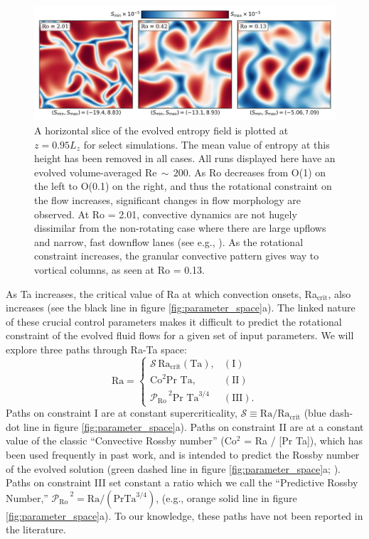 \documentclass[twocolumn, amsmath, amsfonts, amssymb]{aastex62}
\newcommand{\pro}{\ensuremath{\mathcal{P}_{\text{Ro}}\,}}
\begin{document}
\begin{figure}[t]
    \includegraphics[width=\textwidth]{dynamics_plot.png}
    \caption{ A horizontal slice of the evolved entropy field is plotted at $z = 0.95L_z$
    for select simulations. The mean value of entropy at this height has been removed in all
    cases. All runs displayed here have an evolved volume-averaged Re$\,\sim\,200$. 
    As Ro decreases from O(1) on the left to O(0.1) on the right, and thus the rotational
    constraint on the flow increases, significant changes in flow morphology are observed.
    At Ro = 2.01, convective dynamics are not hugely dissimilar from the non-rotating
    case where there are large upflows and narrow, fast downflow lanes (see e.g., \AB).
    As the rotational constraint increases, the granular convective pattern gives way
    to vortical columns, as seen at Ro = 0.13.
    \label{fig:pretty_convection} }
\end{figure}

As Ta increases, the critical value of Ra at which convection onsets,
Ra$_{\text{crit}}$, also increases (see the black line in figure \ref{fig:parameter_space}a). 
The linked nature of these crucial
control parameters makes it difficult to predict the rotational constraint of the evolved
fluid flows for a given set of input parameters. We will
explore three paths through Ra-Ta space:
\begin{equation}
    \text{Ra} = 
    \begin{cases}
    \mathcal{S}\,\text{Ra}_\text{crit}(\text{Ta}), & (\text{I})\\
    \text{Co}^2\text{Pr Ta}, & (\text{II}) \\
    \pro^2 \text{Pr Ta}^{3/4} & (\text{III}).
    \end{cases}
    \label{eqn:paths}
\end{equation}
Paths on constraint I are at constant supercriticality, 
$\mathcal{S} \equiv \text{Ra}/\text{Ra}_{\text{crit}}$
(blue dash-dot line in figure \ref{fig:parameter_space}a).
Paths on constraint II are at a constant value of the classic
``Convective Rossby number'' (Co$^2$ = Ra / [Pr Ta]), which has been used frequently 
in past work, and is intended to predict the Rossby number of the
evolved solution (green dashed line in figure \ref{fig:parameter_space}a; 
\citet{julien&all1996, brummell&all1996}). Paths on constraint
III set constant a ratio which we call the ``Predictive Rossby Number,'' 
$\pro^2 = \text{Ra}/(\text{Pr}\text{Ta}^{3/4})$, 
(e.g., orange solid line in figure \ref{fig:parameter_space}a).
To our knowledge, these paths have not been reported
in the literature.
\end{document}
